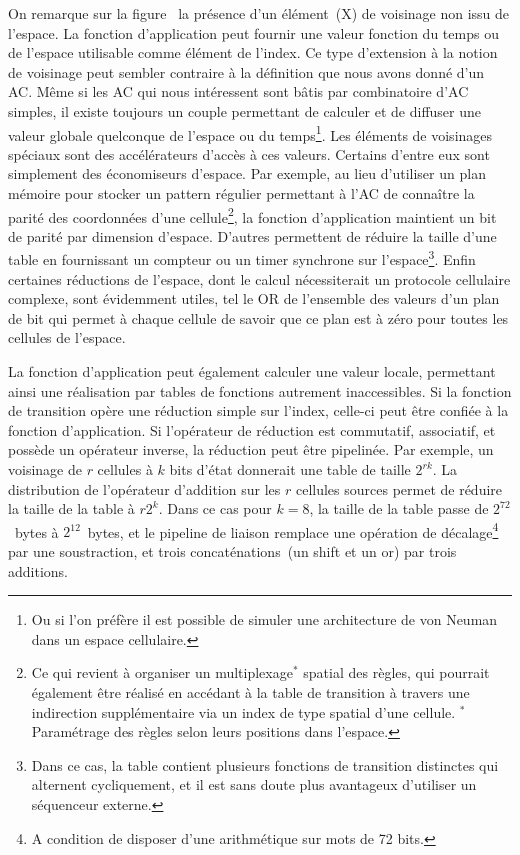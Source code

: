 On remarque sur la figure~ la présence d'un
élément~(X) de voisinage non issu de l'espace. %
La fonction d'application peut fournir une valeur fonction du temps ou
de l'espace utilisable comme élément de l'index. %
Ce type d'extension à la notion de voisinage peut sembler contraire à
la définition que nous avons donné d'un AC\@. %
Même si les AC qui nous intéressent sont bâtis par combinatoire d'AC
simples, il existe toujours un couple  permettant de calculer et de diffuser une valeur
globale quelconque de l'espace ou du temps\footnote{%
  Ou si l'on préfère il est possible de simuler une architecture de
  von Neuman dans un espace cellulaire.}. %
Les éléments de voisinages spéciaux sont des accélérateurs d'accès à
ces valeurs. %
Certains d'entre eux sont simplement des économiseurs d'espace. %
Par exemple, au lieu d'utiliser un plan mémoire pour stocker un
pattern régulier permettant à l'AC de connaître la parité des
coordonnées d'une cellule\footnote{%
  Ce qui revient à organiser un multiplexage$^*$ spatial des règles,
  qui pourrait également être réalisé en accédant à la table de
  transition à travers une indirection supplémentaire via un index de
  type spatial d'une cellule. $^*$Paramétrage des règles selon leurs
  positions dans l'espace.}, %
la fonction d'application maintient un bit de parité par dimension
d'espace. %
D'autres permettent de réduire la taille d'une table en fournissant
un compteur ou un timer synchrone sur l'espace\footnote{%
  Dans ce cas, la table contient plusieurs fonctions de transition
  distinctes qui alternent cycliquement, et il est sans doute plus
  avantageux d'utiliser un séquenceur externe.}. %
Enfin certaines réductions de l'espace, dont le calcul nécessiterait
un protocole cellulaire complexe, sont évidemment utiles, tel le OR de
l'ensemble des valeurs d'un plan de bit qui permet à chaque cellule de
savoir que ce plan est à zéro pour toutes les cellules de l'espace. %

La fonction d'application peut également calculer une valeur locale,
permettant ainsi une réalisation par tables de fonctions autrement
inaccessibles. %
Si la fonction de transition opère une réduction simple sur l'index,
celle-ci peut être confiée à la fonction d'application. %
Si l'opérateur de réduction est commutatif, associatif, et possède un
opérateur inverse, la réduction peut être pipelinée. %
Par exemple, un voisinage de $r$ cellules à $k$ bits d'état
donnerait une table de taille $2^{rk}$. %
La distribution de l'opérateur d'addition sur les $r$ cellules
sources permet de réduire la taille de la table à %
$r 2^{k}$. %
Dans ce cas pour $k = 8$, la taille de la table passe de %
$2^{72}$~bytes à $2^{12}$~bytes, et le pipeline de liaison remplace une
opération de décalage\footnote{%
  A condition de disposer d'une arithmétique sur mots de 72 bits.} %
par une soustraction, et trois concaténations~(un shift et un or) par
trois additions. %

